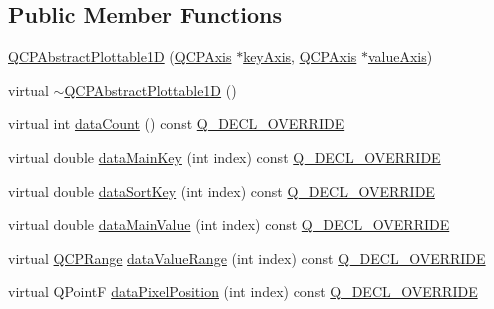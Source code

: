 \subsection*{Public Member Functions}
\begin{DoxyCompactItemize}
\item 
\mbox{\hyperlink{class_q_c_p_abstract_plottable1_d_a30b2e50ab0afce65f104ea7a95440315}{Q\+C\+P\+Abstract\+Plottable1D}} (\mbox{\hyperlink{class_q_c_p_axis}{Q\+C\+P\+Axis}} $\ast$\mbox{\hyperlink{class_q_c_p_abstract_plottable_a2cdd6f0dd5e9a979037f86b4000d9cfe}{key\+Axis}}, \mbox{\hyperlink{class_q_c_p_axis}{Q\+C\+P\+Axis}} $\ast$\mbox{\hyperlink{class_q_c_p_abstract_plottable_af47809a644a68ffd955fb30b01fb4f2f}{value\+Axis}})
\item 
virtual \mbox{\hyperlink{class_q_c_p_abstract_plottable1_d_afa6d5d2c971fed63bff4f4a79989a3f8}{$\sim$\+Q\+C\+P\+Abstract\+Plottable1D}} ()
\item 
virtual int \mbox{\hyperlink{class_q_c_p_abstract_plottable1_d_ab5dd99e4f1621e7dbd63438e0b02984e}{data\+Count}} () const \mbox{\hyperlink{qcustomplot_8h_a42cc5eaeb25b85f8b52d2a4b94c56f55}{Q\+\_\+\+D\+E\+C\+L\+\_\+\+O\+V\+E\+R\+R\+I\+DE}}
\item 
virtual double \mbox{\hyperlink{class_q_c_p_abstract_plottable1_d_aeb156ebf5d3c8de906b428be30733ad8}{data\+Main\+Key}} (int index) const \mbox{\hyperlink{qcustomplot_8h_a42cc5eaeb25b85f8b52d2a4b94c56f55}{Q\+\_\+\+D\+E\+C\+L\+\_\+\+O\+V\+E\+R\+R\+I\+DE}}
\item 
virtual double \mbox{\hyperlink{class_q_c_p_abstract_plottable1_d_aa8277da921b009bce474437d50b4a2d8}{data\+Sort\+Key}} (int index) const \mbox{\hyperlink{qcustomplot_8h_a42cc5eaeb25b85f8b52d2a4b94c56f55}{Q\+\_\+\+D\+E\+C\+L\+\_\+\+O\+V\+E\+R\+R\+I\+DE}}
\item 
virtual double \mbox{\hyperlink{class_q_c_p_abstract_plottable1_d_a6be0f657ba85a1688336d76ad649ecf2}{data\+Main\+Value}} (int index) const \mbox{\hyperlink{qcustomplot_8h_a42cc5eaeb25b85f8b52d2a4b94c56f55}{Q\+\_\+\+D\+E\+C\+L\+\_\+\+O\+V\+E\+R\+R\+I\+DE}}
\item 
virtual \mbox{\hyperlink{class_q_c_p_range}{Q\+C\+P\+Range}} \mbox{\hyperlink{class_q_c_p_abstract_plottable1_d_a55f937ba6a63e56e57f0b1a6e85a333a}{data\+Value\+Range}} (int index) const \mbox{\hyperlink{qcustomplot_8h_a42cc5eaeb25b85f8b52d2a4b94c56f55}{Q\+\_\+\+D\+E\+C\+L\+\_\+\+O\+V\+E\+R\+R\+I\+DE}}
\item 
virtual Q\+PointF \mbox{\hyperlink{class_q_c_p_abstract_plottable1_d_a6ca0699a6af5f25a7565de7c50ce13b2}{data\+Pixel\+Position}} (int index) const \mbox{\hyperlink{qcustomplot_8h_a42cc5eaeb25b85f8b52d2a4b94c56f55}{Q\+\_\+\+D\+E\+C\+L\+\_\+\+O\+V\+E\+R\+R\+I\+DE}}

\end{DoxyCompactItemize}

